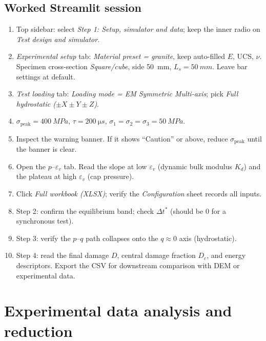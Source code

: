 \documentclass[11pt,a4paper,openany]{book}
\providecommand{\SI}[2]{\qty{#1}{#2}}
\theoremstyle{handbook}
\newcommand{\sig}{\sigma}
\newcommand{\eps}{\varepsilon}
\newcommand{\Ls}{L_s}
\newcommand{\sigpeak}{\sig_{\text{peak}}}
\begin{document}
\section{Worked Streamlit session}

\begin{stepbox}
\begin{enumerate}[leftmargin=*,itemsep=3pt]
  \item Top sidebar: select \emph{Step 1: Setup, simulator and data}; keep
        the inner radio on \emph{Test design and simulator}.
  \item \emph{Experimental setup} tab: \emph{Material preset = granite},
        keep auto-filled $E$, UCS, $\nu$. Specimen cross-section
        \emph{Square/cube}, side \SI{50}{mm}, $\Ls=\SI{50}{mm}$. Leave bar
        settings at default.
  \item \emph{Test loading} tab: \emph{Loading mode = EM Symmetric
        Multi-axis}; pick \emph{Full hydrostatic
        ($\pm X\pm Y\pm Z$)}.
  \item $\sigpeak=\SI{400}{MPa}$, $\tau=\SI{200}{\micro s}$,
        $\sig_1=\sig_2=\sig_3=\SI{50}{MPa}$.
  \item Inspect the warning banner. If it shows ``Caution'' or above,
        reduce $\sigpeak$ until the banner is clear.
  \item Open the $p$--$\eps_v$ tab. Read the slope at low $\eps_v$ (dynamic
        bulk modulus $K_d$) and the plateau at high $\eps_v$ (cap
        pressure).
  \item Click \emph{Full workbook (XLSX)}; verify the
        \emph{Configuration} sheet records all inputs.
  \item Step 2: confirm the equilibrium band; check $\Delta t^{\ast}$
        (should be 0 for a synchronous test).
  \item Step 3: verify the $p$--$q$ path collapses onto the $q\approx 0$
        axis (hydrostatic).
  \item Step 4: read the final damage $D$, central damage fraction $D_c$,
        and energy descriptors. Export the CSV for downstream comparison
        with DEM or experimental data.
\end{enumerate}
\end{stepbox}

\chapter{Experimental data analysis and reduction}\label{ch:expdata}
\end{document}
